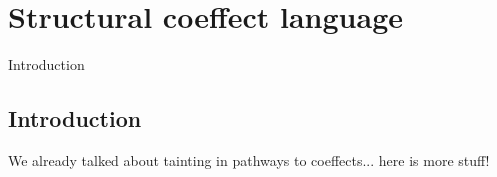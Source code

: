 \chapter{Structural coeffect language} 
\label{ch:structural} 

\newcommand{\ctimes}{ \hat{\times} }
\newcommand{\cdupl}[0]{ \Delta } %

\newcommand{\csprd}[0]{ \times }
\newcommand{\csvop}[0]{ \vee }

\newcommand{\clflt}{$\lambda_{\textnormal{\sffamily Cf}}$}
\newcommand{\clstr}{$\lambda_{\textnormal{\sffamily Cs}}$}

\newcommand{\ruleft}[1]{\textsf{\clflt\small{-T#1}}}
\newcommand{\rulefs}[1]{\textsf{\clflt\small{-S#1}}}
\newcommand{\rulest}[1]{\textsf{\clstr\small{-T#1}}}
\newcommand{\ruless}[1]{\textsf{\clstr\small{-S#1}}}
\newcommand{\rulessc}[1]{\textsf{\clstr\small{-SC#1}}}


Introduction


\section{Introduction}
\label{sec:structural-intro}

We already talked about tainting in pathways to coeffects... here is more stuff!

~

~

